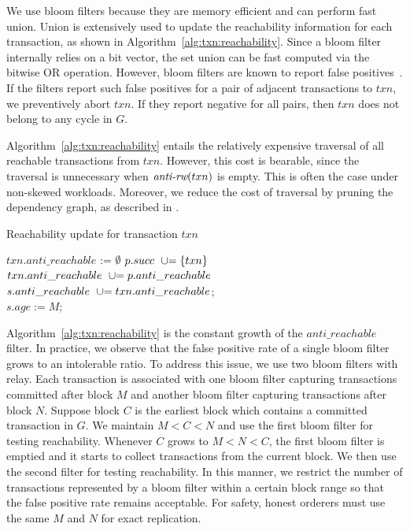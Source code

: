 {We use bloom filters because they are memory efficient and can perform
fast union.
%
Union is extensively used to update the reachability information for each
transaction, as shown in Algorithm~\ref{alg:txn:reachability}.
%
Since a bloom filter internally relies on a bit vector, the set union can be
fast computed via the bitwise OR operation.
%
However, bloom filters are known to report false positives~\cite{bloom1970space}.
%
If the filters report such false positives for a pair of adjacent transactions
to $txn$, we preventively abort $txn$.
%
If they report negative for all pairs, then $txn$ does not belong to any
cycle in $G$.

Algorithm~\ref{alg:txn:reachability} entails the relatively expensive traversal of all
reachable transactions from $txn$.
%
However, this cost is bearable, since the traversal is unnecessary when
$\textit{anti-rw}(txn)$ is empty.
%
This is often the case under non-skewed workloads.
%
Moreover, we reduce the cost of traversal by pruning the dependency graph, as described in .

\begin{algorithm}
  \caption{Reachability update for transaction $txn$}
  \label{alg:txn:reachability}

  $txn.anti\_reachable$ := $\emptyset$\;
   {
      $p.succ \ \mathrel{{\cup}{=}} \{txn\}$\;
      $txn.anti\_reachable \ \mathrel{{\cup}{=}}
      p.anti\_reachable$\; }
   {
      $s.anti\_reachable \ \mathrel{{\cup}{=}}
      txn.anti\_reachable$;\\
      $s.age := M$;\label{alg:txn:age}}
\end{algorithm}

Algorithm~\ref{alg:txn:reachability} is the constant growth of the
$anti\_reachable$ filter.
%
In practice, we observe that the false positive rate of a single bloom filter
grows to an intolerable ratio.
%
To address this issue, we use two bloom filters with relay.
%
Each transaction is associated with one bloom filter capturing transactions
committed after block $M$ and another bloom filter capturing transactions after
block $N$.
%
Suppose block $C$ is the earliest block which contains a committed transaction
in $G$.
%
We maintain $M < C < N$ and use the first bloom filter for testing reachability.
%
Whenever $C$ grows to $M < N < C$, the first bloom filter is emptied and it
starts to collect transactions from the current block.
%
We then use the second filter for testing reachability.
%
In this manner, we restrict the number of transactions represented by a bloom
filter within a certain block range so that the false positive rate remains
acceptable. 
%
For safety, honest orderers must use the same $M$ and $N$ for exact replication.


}
